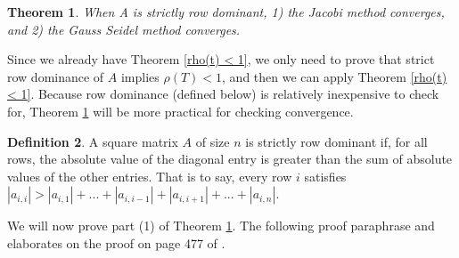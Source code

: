 \documentclass[12pt,letterpaper]{article}
\newtheorem{thm}{Theorem}[section]
\theoremstyle{definition}
\newtheorem{defn}[thm]{Definition}
\begin{document}
\begin{thm}\label{Jacobi GS Convergence Thm}When A is strictly row dominant, 1) the Jacobi method converges, and 2) the Gauss Seidel method converges.\end{thm} 

Since we already have Theorem \ref{rho(t) < 1}, we only need to prove that strict row dominance of $A$ implies $\rho(T) < 1$, and then we can apply Theorem \ref{rho(t) < 1}. Because row dominance (defined below) is relatively inexpensive to check for, Theorem \ref{Jacobi GS Convergence Thm} will be more practical for checking convergence.

\begin{defn}\label{Strictly Row Dominant Matrices}
A square matrix $A$ of size $n$ is strictly row dominant if, for all rows, the absolute value of the diagonal entry is greater than the sum of absolute values of the other entries. That is to say, every row $i$ satisfies $|a_{i,i}| > |a_{i,1}| + ... + |a_{i,i-1}| + |a_{i,i+1}| + ... + |a_{i,n}|$.
\end{defn}
\noindent We will now prove part (1) of Theorem \ref{Jacobi GS Convergence Thm}. The following proof paraphrase and elaborates on the proof on page 477 of \cite{Ford15}.
\end{document}
